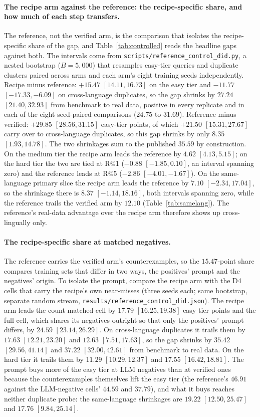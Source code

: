 \paragraph{The recipe arm against the reference: the recipe-specific share, and how much of each step transfers.}
The reference, not the verified arm, is the comparison that isolates the recipe-specific share of the gap, and Table~\ref{tab:controlled} reads the headline gaps against both. The intervals come from \texttt{scripts/reference\_control\_did.py}, a nested bootstrap ($B = 5{,}000$) that resamples easy-tier queries and duplicate clusters paired across arms and each arm's eight training seeds independently. Recipe minus reference: $+15.47$ $[14.11, 16.73]$ on the easy tier and $-11.77$ $[-17.33, -6.09]$ on cross-language duplicates, so the gap shrinks by $27.24$ $[21.40, 32.93]$ from benchmark to real data, positive in every replicate and in each of the eight seed-paired comparisons ($24.75$ to $31.69$). Reference minus verified: $+29.85$ $[28.56, 31.15]$ easy-tier points, of which $+21.50$ $[15.31, 27.67]$ carry over to cross-language duplicates, so this gap shrinks by only $8.35$ $[1.93, 14.78]$. The two shrinkages sum to the published $35.59$ by construction. On the medium tier the recipe arm leads the reference by $4.62$ $[4.13, 5.15]$; on the hard tier the two are tied at R@1 ($-0.88$ $[-1.85, 0.10]$, an interval spanning zero) and the reference leads at R@5 ($-2.86$ $[-4.01, -1.67]$). On the same-language primary slice the recipe arm leads the reference by $7.10$ $[-2.34, 17.04]$, so the shrinkage there is $8.37$ $[-1.14, 18.16]$, both intervals spanning zero, while the reference trails the verified arm by $12.10$ (Table~\ref{tab:samelang}). The reference's real-data advantage over the recipe arm therefore shows up cross-lingually only.

\paragraph{The recipe-specific share at matched negatives.}
The reference carries the verified arm's counterexamples, so the $15.47$-point share compares training sets that differ in two ways, the positives' prompt and the negatives' origin. To isolate the prompt, compare the recipe arm with the D4 cells that carry the recipe's own near-misses (three seeds each; same bootstrap, separate random stream, \texttt{results/reference\_control\_did.json}). The recipe arm leads the count-matched cell by $17.79$ $[16.25, 19.38]$ easy-tier points and the full cell, which shares its negatives outright so that only the positives' prompt differs, by $24.59$ $[23.14, 26.29]$. On cross-language duplicates it trails them by $17.63$ $[12.21, 23.20]$ and $12.63$ $[7.51, 17.63]$, so the gap shrinks by $35.42$ $[29.56, 41.14]$ and $37.22$ $[32.00, 42.61]$ from benchmark to real data. On the hard tier it trails them by $11.29$ $[10.29, 12.37]$ and $17.55$ $[16.42, 18.81]$. The prompt buys more of the easy tier at LLM negatives than at verified ones because the counterexamples themselves lift the easy tier (the reference's $46.91$ against the LLM-negative cells' $44.59$ and $37.79$), and what it buys reaches neither duplicate probe: the same-language shrinkages are $19.22$ $[12.50, 25.47]$ and $17.76$ $[9.84, 25.14]$.

